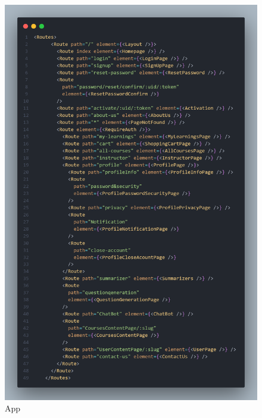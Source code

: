 \begin{figure}[h!]
	\centering
	\includegraphics[max height=\textheight,max width=\textwidth]{figures/srccode/App.png}
	\caption{App}
\end{figure}

